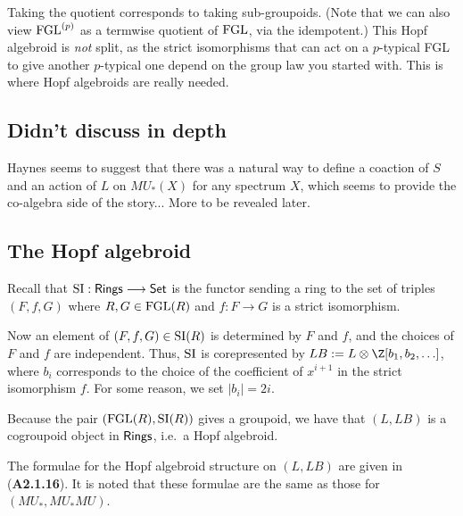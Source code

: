 \documentclass[11pt]{article}
\begin{document}
\begin{Formal Group Laws}
\begin{shaded}
Taking the quotient corresponds to taking sub-groupoids. (Note that we can also view $\textup{FGL}^{(p)}$ as a termwise quotient of $\textup{FGL}$, via the idempotent.) This Hopf algebroid is \emph{not} split, as the strict isomorphisms that can act on a $p$-typical FGL to give another $p$-typical one depend on the group law you started with. This is where Hopf algebroids are really needed.
\subsection*{Didn't discuss in depth}
Haynes seems to suggest that there was a natural way to define a coaction of $S$ and an action of $L$ on $MU_*(X)$ for any spectrum $X$, which seems to provide the co-algebra side of the story... More to be revealed later.


\end{shaded}

\subsection*{The Hopf algebroid}
Recall that $\textup{SI}:\textsf{Rings}\longrightarrow\operatorname{{\mathsf{Set}}}$ is the functor sending a ring to the set of triples $(F,f,G)$ where $R,G\in\textup{FGL}(R)$ and $f:F\to G$ is a strict isomorphism.

Now an element of $(F,f,G)\in\textup{SI}(R)$ is determined by $F$ and $f$, and the choices of $F$ and $f$ are independent. Thus, $\textup{SI}$ is corepresented by $LB:=L\otimes\Z[b_1,b_2,\ldots]$, where $b_i$ corresponds to the choice of the coefficient of $x^{i+1}$ in the strict isomorphism $f$. For some reason, we set $|b_i|=2i$.

Because the pair $(\textup{FGL}(R),\textup{SI}(R))$ gives a groupoid, we have that $(L,LB)$ is a cogroupoid object in $\operatorname{{\mathsf{Rings}}}$, i.e.\ a Hopf algebroid.
\begin{itemise}
\item The formulae for the Hopf algebroid structure on $(L,LB)$ are given in (\textbf{A2.1.16}). It is noted that these formulae are the same as those for $(MU_*,MU_*MU)$.
\end{itemise}
\end{Formal Group Laws}
\end{document}
